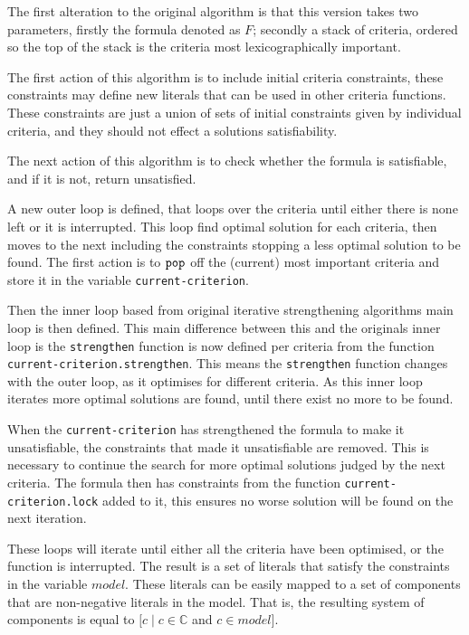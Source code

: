 The first alteration to the original algorithm is that this version takes two parameters, firstly the formula denoted as $F$;
secondly a stack of criteria, ordered so the top of the stack is the criteria most lexicographically important.

The first action of this algorithm is to include initial criteria constraints,
these constraints may define new literals that can be used in other criteria functions.
These constraints are just a union of sets of initial constraints given by individual criteria, and they should not effect a solutions satisfiability. 

The next action of this algorithm is to check whether the formula is satisfiable,
and if it is not, return unsatisfied.

A new outer loop is defined, that loops over the criteria until either there is none left or it is interrupted.
This loop find optimal solution for each criteria, then moves to the next including the constraints stopping a less optimal solution to be found.
The first action is to $\verb+pop+$ off the (current) most important criteria and store it in the variable \verb+current-criterion+.

Then the inner loop based from original iterative strengthening algorithms main loop is then defined.
This main difference between this and the originals inner loop is the \verb+strengthen+ function is now defined per criteria from the function \verb+current-criterion.strengthen+.
This means the \verb+strengthen+ function changes with the outer loop, as it optimises for different criteria.
As this inner loop iterates more optimal solutions are found, until there exist no more to be found.

When the \verb+current-criterion+ has strengthened the formula to make it unsatisfiable, the constraints that made it unsatisfiable are removed.
This is necessary to continue the search for more optimal solutions judged by the next criteria.
The formula then has constraints from the function \verb+current-criterion.lock+ added to it, this ensures no worse solution will be found on the next iteration.

These loops will iterate until either all the criteria have been optimised, or the function is interrupted.
The result is a set of literals that satisfy the constraints in the variable $model$.
These literals can be easily mapped to a set of components that are non-negative literals in the model.
That is, the resulting system of components is equal to $[c \mid c \in \mathbb{C}$ and $c \in model]$.

